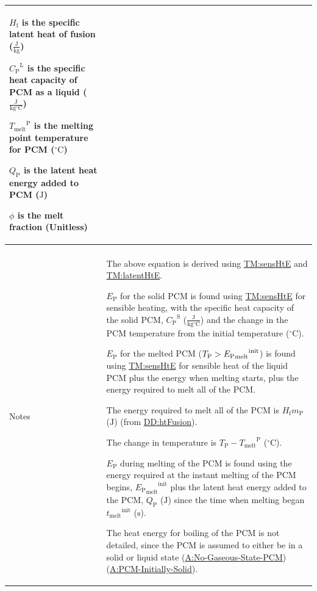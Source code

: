 \documentclass[12pt]{article}
\newcommand{\gt}{\ensuremath >}
\begin{document}
\begin{minipage}{\textwidth}
\begin{tabular}{>{\raggedright}p{}>{\raggedright\arraybackslash}p{}}
\begin{symbDescription}
              \item{${H_{\text{f}}}$ is the specific latent heat of fusion ($\frac{\text{J}}{\text{kg}}$)}
              \item{${{C_{\text{P}}}^{\text{L}}}$ is the specific heat capacity of PCM as a liquid ($\frac{\text{J}}{\text{kg}{}^{\circ}\text{C}}$)}
              \item{${{T_{\text{melt}}}^{\text{P}}}$ is the melting point temperature for PCM (${{}^{\circ}\text{C}}$)}
              \item{${Q_{\text{P}}}$ is the latent heat energy added to PCM (${\text{J}}$)}
              \item{$ϕ$ is the melt fraction (Unitless)}
              \end{symbDescription}
\\ \midrule \\
Notes & The above equation is derived using \hyperref[TM:sensHtE]{TM:sensHtE} and \hyperref[TM:latentHtE]{TM:latentHtE}.
        
        ${E_{\text{P}}}$ for the solid PCM is found using \hyperref[TM:sensHtE]{TM:sensHtE} for sensible heating, with the specific heat capacity of the solid PCM, ${{C_{\text{P}}}^{\text{S}}}$ ($\frac{\text{J}}{\text{kg}{}^{\circ}\text{C}}$) and the change in the PCM temperature from the initial temperature (${{}^{\circ}\text{C}}$).
        
        ${E_{\text{P}}}$ for the melted PCM (${T_{\text{P}}}\gt{}{{{E_{\text{P}}}_{\text{melt}}}^{\text{init}}}$) is found using \hyperref[TM:sensHtE]{TM:sensHtE} for sensible heat of the liquid PCM plus the energy when melting starts, plus the energy required to melt all of the PCM.
        
        The energy required to melt all of the PCM is ${H_{\text{f}}} {m_{\text{P}}}$ (${\text{J}}$) (from \hyperref[DD:htFusion]{DD:htFusion}).
        
        The change in temperature is ${T_{\text{P}}}-{{T_{\text{melt}}}^{\text{P}}}$ (${{}^{\circ}\text{C}}$).
        
        ${E_{\text{P}}}$ during melting of the PCM is found using the energy required at the instant melting of the PCM begins, ${{{E_{\text{P}}}_{\text{melt}}}^{\text{init}}}$ plus the latent heat energy added to the PCM, ${Q_{\text{P}}}$ (${\text{J}}$) since the time when melting began ${{t_{\text{melt}}}^{\text{init}}}$ (${\text{s}}$).
        
        The heat energy for boiling of the PCM is not detailed, since the PCM is assumed to either be in a solid or liquid state (\hyperref[assumpNGSP]{A:No-Gaseous-State-PCM}) (\hyperref[assumpPIS]{A:PCM-Initially-Solid}).
        

\end{tabular}
\end{minipage}
\end{document}
